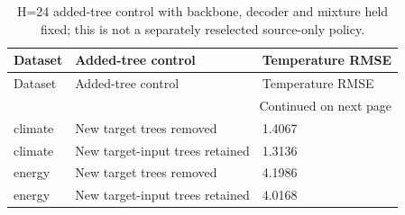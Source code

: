 {\footnotesize
\setlength{\tabcolsep}{3pt}
\renewcommand{\arraystretch}{1.17}
\begin{longtable}{@{}p{}p{}p{}@{}}
\caption{H=24 added-tree control with backbone, decoder and mixture held fixed; this is not a separately reselected source-only policy.}\label{tab:boost_ablation}\\
\toprule
Dataset & Added-tree control & Temperature RMSE \\
\midrule\endfirsthead
Dataset & Added-tree control & Temperature RMSE \\
\midrule\endhead
\midrule\multicolumn{3}{r}{Continued on next page}\\\endfoot
\bottomrule\endlastfoot
climate & New target trees removed & 1.4067 \\
climate & New target-input trees retained & 1.3136 \\
energy & New target trees removed & 4.1986 \\
energy & New target-input trees retained & 4.0168 \\
\end{longtable}
}
